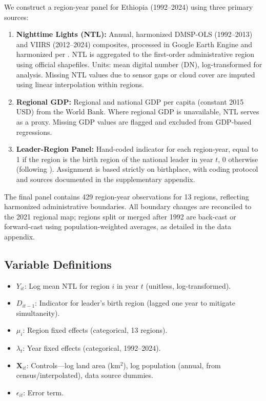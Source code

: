 \documentclass[12pt,a4paper]{article}
\begin{document}
We construct a region-year panel for Ethiopia (1992--2024) using three primary sources:
\begin{enumerate}
	\item \textbf{Nighttime Lights (NTL):} Annual, harmonized DMSP-OLS (1992--2013) and VIIRS (2012--2024) composites, processed in Google Earth Engine and harmonized per \citet{Li2023, Elvidge2021}. NTL is aggregated to the first-order administrative region using official shapefiles. Units: mean digital number (DN), log-transformed for analysis. Missing NTL values due to sensor gaps or cloud cover are imputed using linear interpolation within regions.
	\item \textbf{Regional GDP:} Regional and national GDP per capita (constant 2015 USD) from the World Bank. Where regional GDP is unavailable, NTL serves as a proxy. Missing GDP values are flagged and excluded from GDP-based regressions.
	\item \textbf{Leader-Region Panel:} Hand-coded indicator for each region-year, equal to 1 if the region is the birth region of the national leader in year $t$, 0 otherwise (following \citet{Hodler2014}). Assignment is based strictly on birthplace, with coding protocol and sources documented in the supplementary appendix.
\end{enumerate}

The final panel contains 429 region-year observations for 13 regions, reflecting harmonized administrative boundaries. All boundary changes are reconciled to the 2021 regional map; regions split or merged after 1992 are back-cast or forward-cast using population-weighted averages, as detailed in the data appendix.

\subsection{Variable Definitions}
\begin{itemize}
	\item $Y_{it}$: Log mean NTL for region $i$ in year $t$ (unitless, log-transformed).
	\item $D_{it-1}$: Indicator for leader’s birth region (lagged one year to mitigate simultaneity).
	\item $\mu_i$: Region fixed effects (categorical, 13 regions).
	\item $\lambda_t$: Year fixed effects (categorical, 1992--2024).
	\item $\mathbf{X}_{it}$: Controls---log land area (km$^2$), log population (annual, from census/interpolated), data source dummies.
	\item $\epsilon_{it}$: Error term.
\end{itemize}
\end{document}
